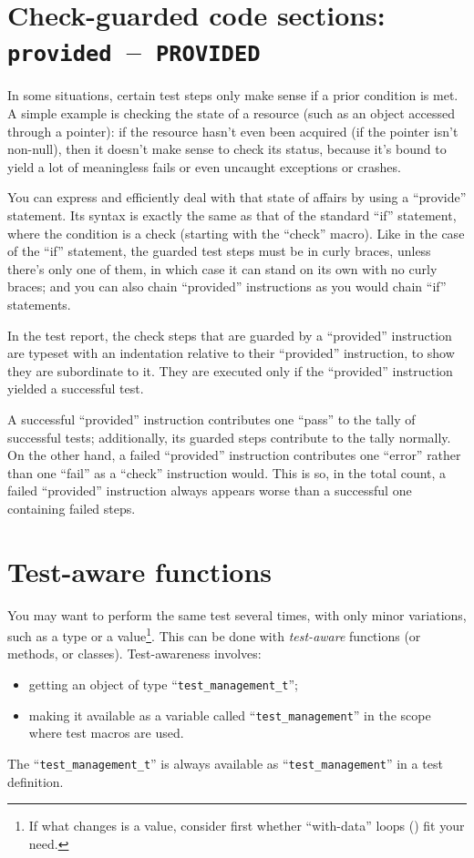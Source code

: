 \documentclass[twoside, a4paper, article]{memoir}
\newcommand*\testudocolor{\color{red!80!blue}}
\newcommand*\testudo[1]{\texttt{\testudocolor{}#1}}
\newcommand*\testudopair[2]{\testudo{#1}~--~\testudo{#2}}
\newcommand\chaptertestudopair[3]{%
  \chapter[#1]{#1: \testudopair{#2}{#3}}}
\newcommand\typesetexampleandreport[1]{%
  \typesetexamplesource{#1}
  \typesetexamplereport{#1}
}
\providecommand\typesetexamplereport[1]{%
}
\providecommand\typesetexamplesource[1]{%
}
\begin{document}
\chaptertestudopair{Check-guarded code sections}{provided}{PROVIDED}
\label{cha:check-guarded-code-sections}

In some situations, certain test steps only make sense if a prior condition is
met.  A simple example is checking the state of a resource (such as an object
accessed through a pointer): if the resource hasn't even been acquired (if the
pointer isn't non-null), then it doesn't make sense to check its status,
because it's bound to yield a lot of meaningless fails or even uncaught
exceptions or crashes.

You can express and efficiently deal with that state of affairs by using a
``provide'' statement.  Its syntax is exactly the same as that of the standard
``if'' statement, where the condition is a check (starting with the ``check''
macro).  Like in the case of the ``if'' statement, the guarded test steps must
be in curly braces, unless there's only one of them, in which case it can stand
on its own with no curly braces; and you can also chain ``provided''
instructions as you would chain ``if'' statements.

\typesetexampleandreport{provided}

In the test report, the check steps that are guarded by a ``provided''
instruction are typeset with an indentation relative to their ``provided''
instruction, to show they are subordinate to it.  They are executed only if the
``provided'' instruction yielded a successful test.

A successful ``provided'' instruction contributes one ``pass'' to the tally of
successful tests; additionally, its guarded steps contribute to the tally
normally.  On the other hand, a failed ``provided'' instruction contributes one
``error'' rather than one ``fail'' as a ``check'' instruction would.  This is
so, in the total count, a failed ``provided'' instruction always appears worse
than a successful one containing failed steps.

\chapter{Test-aware functions}
\label{cha:test-aware-functions}

You may want to perform the same test several times, with only minor
variations, such as a type or a value\footnote{If what changes is a value,
  consider first whether ``with-data'' loops () fit
  your need.}.  This can be done with \emph{test-aware} functions (or methods,
or classes).  Test-awareness involves:
\begin{itemize}
\item getting an object of type ``\texttt{test\_management\_t}'';
\item making it available as a variable called ``\texttt{test\_management}'' in
  the scope where test macros are used.
\end{itemize}
The ``\texttt{test\_management\_t}'' is always available as
``\texttt{test\_management}'' in a test definition.
\end{document}
